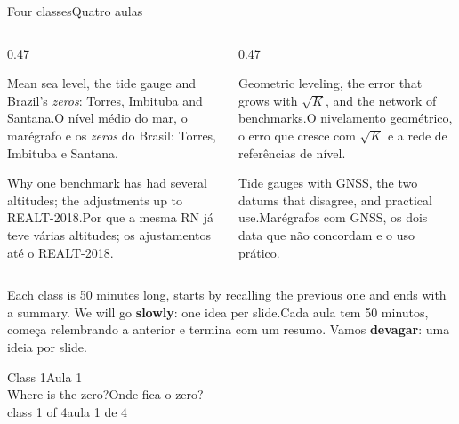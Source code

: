 \documentclass[aspectratio=169,11pt]{beamer}
\newcommand{\tr}[2]{\ifEN#2\else#1\fi}
\newcommand{\bnum}[1]{\ifmmode\textcolor{mTeal}{\mathbf{#1}}\else\textbf{\textcolor{mTeal}{#1}}\fi}
\begin{document}
\begin{frame}{\tr{Quatro aulas}{Four classes}}
  \begin{columns}[T]
    \begin{column}{0.47\textwidth}
      \begin{regra}[title={\tr{Aula 1 · Onde fica o zero?}{Class 1 · Where is the zero?}}]
        \small\tr{O nível médio do mar, o marégrafo e os \emph{zeros} do Brasil: Torres,
        Imbituba e Santana.}{Mean sea level, the tide gauge and Brazil's \emph{zeros}: Torres,
        Imbituba and Santana.}
      \end{regra}
      \vspace{2pt}
      \begin{regra}[title={\tr{Aula 3 · Ajustamentos e REALT}{Class 3 · Adjustments, REALT}}]
        \small\tr{Por que a mesma RN já teve várias altitudes; os ajustamentos até o
        REALT-2018.}{Why one benchmark has had several altitudes; the adjustments up to
        REALT-2018.}
      \end{regra}
    \end{column}
    \begin{column}{0.47\textwidth}
      \begin{regra}[title={\tr{Aula 2 · Lance a lance}{Class 2 · Leg by leg}}]
        \small\tr{O nivelamento geométrico, o erro que cresce com $\sqrt{K}$ e a rede de
        referências de nível.}{Geometric leveling, the error that grows with $\sqrt{K}$, and the
        network of benchmarks.}
      \end{regra}
      \vspace{2pt}
      \begin{regra}[title={\tr{Aula 4 · O zero hoje e amanhã}{Class 4 · The zero, now and next}}]
        \small\tr{Marégrafos com GNSS, os dois data que não concordam e o uso prático.}{Tide
        gauges with GNSS, the two datums that disagree, and practical use.}
      \end{regra}
    \end{column}
  \end{columns}
  \vspace{2pt}
  \centering\footnotesize
  \tr{Cada aula tem 50 minutos, começa relembrando a anterior e termina com um resumo.
  Vamos \bnum{devagar}: uma ideia por slide.}{Each class is 50 minutes long, starts by
  recalling the previous one and ends with a summary. We will go \bnum{slowly}: one idea per
  slide.}
\end{frame}
\begin{frame}[standout]
  \tr{Aula 1}{Class 1}\\[6pt]
  {\normalsize \tr{Onde fica o zero?}{Where is the zero?}}\\[4pt]
  {\scriptsize \tr{aula 1 de 4}{class 1 of 4}}
\end{frame}
\end{document}
